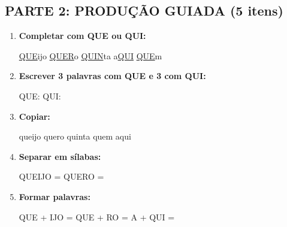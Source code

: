 \begin{exercicio}
\subsection*{PARTE 2: PRODUÇÃO GUIADA (5 itens)}

\begin{enumerate}[resume]
  \item \textbf{Completar com QUE ou QUI:}
  \begin{center}
  \underline{QUE}ijo \quad \underline{QUER}o \quad \underline{QUIN}ta \quad a\underline{QUI} \quad \underline{QUE}m
  \end{center}

  \item \textbf{Escrever 3 palavras com QUE e 3 com QUI:}
  \begin{center}
  QUE: \underline{\hspace{2.2cm}} \underline{\hspace{2.2cm}} \underline{\hspace{2.2cm}} \quad QUI: \underline{\hspace{2.2cm}} \underline{\hspace{2.2cm}} \underline{\hspace{2.2cm}}
  \end{center}

  \item \textbf{Copiar:}
  \begin{center}
  queijo \quad quero \quad quinta \quad quem \quad aqui
  \end{center}

  \item \textbf{Separar em sílabas:}
  \begin{center}
  QUEIJO = \underline{\hspace{1cm}} \underline{\hspace{1cm}} \quad QUERO = \underline{\hspace{1cm}} \underline{\hspace{1cm}}
  \end{center}

  \item \textbf{Formar palavras:}
  \begin{center}
  QUE + IJO = \underline{\hspace{2cm}} \quad QUE + RO = \underline{\hspace{2cm}} \quad A + QUI = \underline{\hspace{2cm}}
  \end{center}
\end{enumerate}


\end{exercicio}
